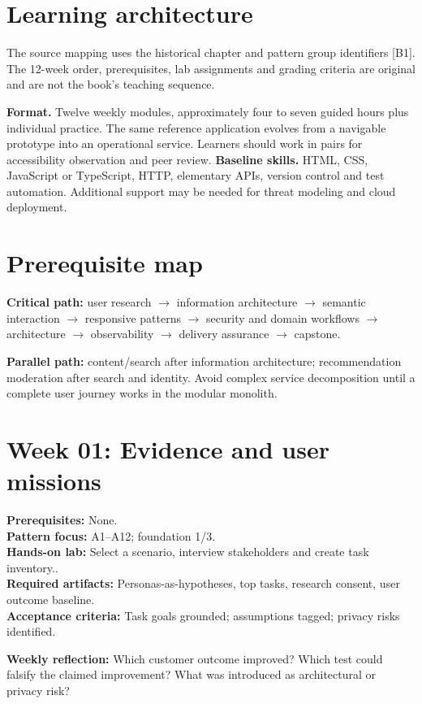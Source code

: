 \documentclass[11pt]{article}
\begin{document}
\MakeFront
\section{Learning architecture}

\Provenance
\begin{groundedbox}The source mapping uses the historical chapter and pattern group identifiers [B1]. The 12-week order, prerequisites, lab assignments and grading criteria are original and are not the book's teaching sequence.\end{groundedbox}
\textbf{Format.} Twelve weekly modules, approximately four to seven guided hours plus individual practice. The same reference application evolves from a navigable prototype into an operational service. Learners should work in pairs for accessibility observation and peer review.
\textbf{Baseline skills.} HTML, CSS, JavaScript or TypeScript, HTTP, elementary APIs, version control and test automation. Additional support may be needed for threat modeling and cloud deployment.

\section{Prerequisite map}

\begin{notebox}\textbf{Critical path:} user research $\rightarrow$ information architecture $\rightarrow$ semantic interaction $\rightarrow$ responsive patterns $\rightarrow$ security and domain workflows $\rightarrow$ architecture $\rightarrow$ observability $\rightarrow$ delivery assurance $\rightarrow$ capstone.

\textbf{Parallel path:} content/search after information architecture; recommendation moderation after search and identity. Avoid complex service decomposition until a complete user journey works in the modular monolith.
\end{notebox}

\section{Week 01: Evidence and user missions}
\textbf{Prerequisites:} None.\\
\textbf{Pattern focus:} A1--A12; foundation 1/3.\\
\textbf{Hands-on lab:} Select a scenario, interview stakeholders and create task inventory..\\
\textbf{Required artifacts:} Personas-as-hypotheses, top tasks, research consent, user outcome baseline.\\
\textbf{Acceptance criteria:} Task goals grounded; assumptions tagged; privacy risks identified.
\begin{decisionbox}\textbf{Weekly reflection:} Which customer outcome improved? Which test could falsify the claimed improvement? What was introduced as architectural or privacy risk?\end{decisionbox}
\end{document}
